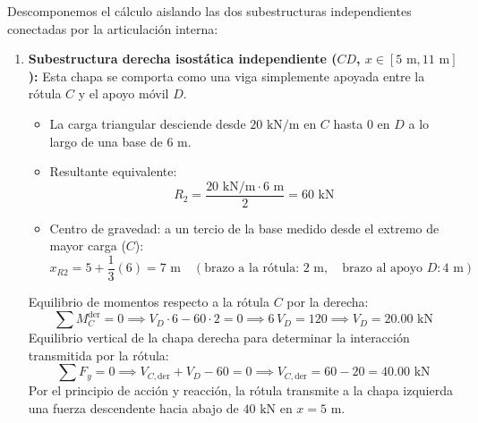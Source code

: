 
Descomponemos el cálculo aislando las dos subestructuras independientes conectadas por la articulación interna:

\begin{enumerate}
    \item \textbf{Subestructura derecha isostática independiente ($CD$, $x \in [5\text{ m}, 11\text{ m}]$):}
          Esta chapa se comporta como una viga simplemente apoyada entre la rótula $C$ y el apoyo móvil $D$.
          \begin{itemize}
              \item La carga triangular desciende desde $20\text{ kN/m}$ en $C$ hasta $0$ en $D$ a lo largo de una base de $6\text{ m}$.
              \item Resultante equivalente:
                    \[
                        R_2 = \frac{20\text{ kN/m} \cdot 6\text{ m}}{2} = 60\text{ kN}
                    \]
              \item Centro de gravedad: a un tercio de la base medido desde el extremo de mayor carga ($C$):
                    \[
                        x_{R2} = 5 + \frac{1}{3}(6) = 7\text{ m} \quad (\text{brazo a la rótula: } 2\text{ m}, \quad \text{brazo al apoyo } D: 4\text{ m})
                    \]
          \end{itemize}
          Equilibrio de momentos respecto a la rótula $C$ por la derecha:
          \begin{equation}
              \sum M_C^{\text{der}} = 0 \implies V_D \cdot 6 - 60 \cdot 2 = 0 \implies 6\,V_D = 120 \implies \boxed{V_D = 20.00\text{ kN}}
          \end{equation}
          Equilibrio vertical de la chapa derecha para determinar la interacción transmitida por la rótula:
          \begin{equation}
              \sum F_y = 0 \implies V_{C,\text{der}} + V_D - 60 = 0 \implies V_{C,\text{der}} = 60 - 20 = 40.00\text{ kN}
          \end{equation}
          Por el principio de acción y reacción, la rótula transmite a la chapa izquierda una fuerza descendente hacia abajo de $40\text{ kN}$ en $x = 5\text{ m}$.


\end{enumerate}
